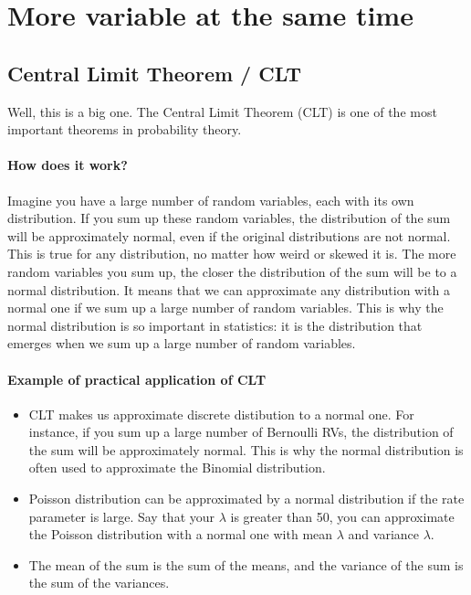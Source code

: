 \documentclass[a4paper]{article}
\begin{document}
\section{More variable at the same time}

\subsection{Central Limit Theorem / CLT}
Well, this is a big one. The Central Limit Theorem (CLT) is one of the most important theorems in probability theory.
\paragraph{How does it work?} Imagine you have a large number of random variables, each with its own distribution. If you sum up these random variables, the distribution of the sum will be approximately normal, even if the original distributions are not normal. This is true for any distribution, no matter how weird or skewed it is. The more random variables you sum up, the closer the distribution of the sum will be to a normal distribution. 
It means that we can approximate any distribution with a normal one if we sum up a large number of random variables. This is why the normal distribution is so important in statistics: it is the distribution that emerges when we sum up a large number of random variables.
\paragraph{Example of practical application of CLT} \begin{itemize}
    \item CLT makes us approximate discrete distibution to a normal one. For instance, if you sum up a large number of Bernoulli RVs, the distribution of the sum will be approximately normal. This is why the normal distribution is often used to approximate the Binomial distribution. 
    \item Poisson distribution can be approximated by a normal distribution if the rate parameter is large. Say that your $\lambda$ is greater than 50, you can approximate the Poisson distribution with a normal one with mean $\lambda$ and variance $\lambda$.
    \item The mean of the sum is the sum of the means, and the variance of the sum is the sum of the variances.
\end{itemize}
\end{document}

